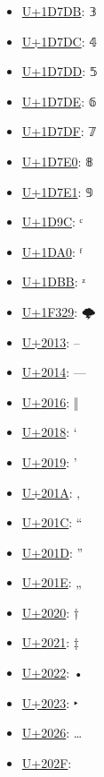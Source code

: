 \begin{itemize}
	\item \href{https://decodeunicode.org/en/u+1D7DB}{U+1D7DB}: 𝟛
	\item \href{https://decodeunicode.org/en/u+1D7DC}{U+1D7DC}: 𝟜
	\item \href{https://decodeunicode.org/en/u+1D7DD}{U+1D7DD}: 𝟝
	\item \href{https://decodeunicode.org/en/u+1D7DE}{U+1D7DE}: 𝟞
	\item \href{https://decodeunicode.org/en/u+1D7DF}{U+1D7DF}: 𝟟
	\item \href{https://decodeunicode.org/en/u+1D7E0}{U+1D7E0}: 𝟠
	\item \href{https://decodeunicode.org/en/u+1D7E1}{U+1D7E1}: 𝟡
	\item \href{https://decodeunicode.org/en/u+1D9C}{U+1D9C}: ᶜ
	\item \href{https://decodeunicode.org/en/u+1DA0}{U+1DA0}: ᶠ
	\item \href{https://decodeunicode.org/en/u+1DBB}{U+1DBB}: ᶻ
	\item \href{https://decodeunicode.org/en/u+1F329}{U+1F329}: 🌩
	\item \href{https://decodeunicode.org/en/u+2013}{U+2013}: –
	\item \href{https://decodeunicode.org/en/u+2014}{U+2014}: —
	\item \href{https://decodeunicode.org/en/u+2016}{U+2016}: ‖
	\item \href{https://decodeunicode.org/en/u+2018}{U+2018}: ‘
	\item \href{https://decodeunicode.org/en/u+2019}{U+2019}: ’
	\item \href{https://decodeunicode.org/en/u+201A}{U+201A}: ‚
	\item \href{https://decodeunicode.org/en/u+201C}{U+201C}: “
	\item \href{https://decodeunicode.org/en/u+201D}{U+201D}: ”
	\item \href{https://decodeunicode.org/en/u+201E}{U+201E}: „
	\item \href{https://decodeunicode.org/en/u+2020}{U+2020}: †
	\item \href{https://decodeunicode.org/en/u+2021}{U+2021}: ‡
	\item \href{https://decodeunicode.org/en/u+2022}{U+2022}: •
	\item \href{https://decodeunicode.org/en/u+2023}{U+2023}: ‣
	\item \href{https://decodeunicode.org/en/u+2026}{U+2026}: …
	\item \href{https://decodeunicode.org/en/u+202F}{U+202F}:  

\end{itemize}
